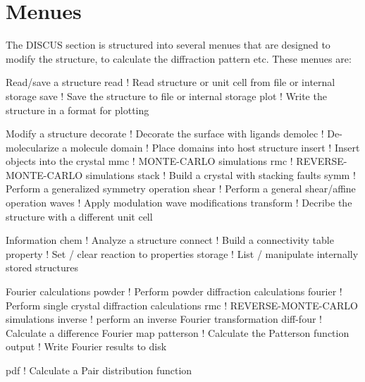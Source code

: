 \section{Menues}
\par
The DISCUS section is structured into several menues that 
are designed to modify the structure, to calculate the 
diffraction pattern etc. 
These menues are: 
\par
Read/save a structure 
read       ! Read structure or unit cell from file or internal storage 
save       ! Save the structure to file or internal storage 
plot       ! Write the structure in a format for plotting 
\par
Modify a structure 
decorate   ! Decorate the surface with ligands 
demolec    ! De-molecularize a molecule 
domain     ! Place domains into host structure 
insert     ! Insert objects into the crystal 
mmc        ! MONTE-CARLO simulations 
rmc        ! REVERSE-MONTE-CARLO simulations 
stack      ! Build a crystal with stacking faults 
symm       ! Perform a generalized symmetry operation 
shear      ! Perform a general shear/affine operation 
waves      ! Apply modulation wave modifications 
transform  ! Decribe the structure with a different unit cell 
\par
Information 
chem       ! Analyze a structure 
connect    ! Build a connectivity table 
property   ! Set / clear reaction to properties 
storage    ! List / manipulate internally stored structures 
\par
Fourier calculations 
powder     ! Perform powder diffraction calculations 
fourier    ! Perform single crystal diffraction calculations 
rmc        ! REVERSE-MONTE-CARLO simulations 
inverse    ! perform an inverse Fourier transformation 
diff-four  ! Calculate a difference Fourier map 
patterson  ! Calculate the Patterson function 
output     ! Write Fourier results to disk 
\par
pdf        ! Calculate a Pair distribution function 
